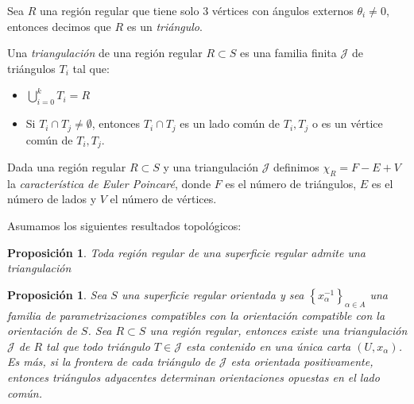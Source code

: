 \documentclass[11pt]{article}
\newcommand{\sett}[1]{\left\lbrace#1\right\rbrace}
\newtheorem{proposition}[theorem]{Proposici\'on}
\newenvironment{definition}[1][Definici\'on]{\begin{trivlist}
		\item[\hskip \labelsep {\bfseries #1}]}{\end{trivlist}}
\begin{document}
\begin{definition}
	
	Sea $R$ una regi\'on regular que tiene solo $3$ v\'ertices con \'angulos externos $\theta_i \neq 0$, entonces decimos que $R$ es un \textit{tri\'angulo}.
	
\end{definition}

\begin{definition}
	Una \textit{triangulaci\'on} de una regi\'on regular $R \subset S$ es una familia finita $\mathcal{J}$ de tri\'angulos $T_i$ tal que:
	
	\begin{itemize}
		\item $\bigcup\limits_{i=0}^{k}{T_i} = R$
		\item Si $T_i \cap T_j \neq \emptyset$, entonces $T_i \cap T_j$ es un lado com\'un de $T_i,T_j$ o es un v\'ertice com\'un de $T_i,T_j$.
	\end{itemize}
	
\end{definition}

\begin{definition}
	Dada una regi\'on regular $R \subset S$ y una triangulaci\'on $\mathcal{J}$ definimos $\chi_R = F-E+V$ la \textit{caracter\'istica de Euler Poincar\'e}, donde $F$ es el n\'umero de tri\'angulos, $E$ es el n\'umero de lados y $V$ el n\'umero de v\'ertices.
\end{definition}

Asumamos los siguientes resultados topol\'ogicos:

\begin{proposition}
	\label{existencia de triangulacion}
	Toda regi\'on regular de una superficie regular admite una triangulaci\'on
\end{proposition}

\begin{proposition}
	\label{Existencia de triangulacion linda}
	Sea $S$ una superficie regular orientada y sea $\sett{x^{-1}_{\alpha}}_{\alpha \in A}$ una familia de parametrizaciones compatibles con la orientaci\'on compatible con la orientaci\'on de $S$. Sea $R \subset S$ una regi\'on regular, entonces existe una triangulaci\'on $\mathcal{J}$ de $R$ tal que todo tri\'angulo $T \in \mathcal{J}$ esta contenido en una \'unica carta $(U,x_{\alpha})$. Es m\'as, si la frontera de cada tri\'angulo de $\mathcal{J}$ esta orientada positivamente, entonces tri\'angulos adyacentes determinan orientaciones opuestas en el lado com\'un.
\end{proposition}
\end{document}
